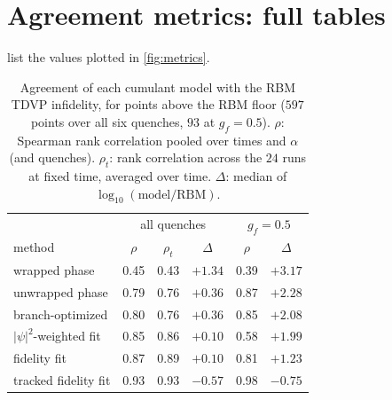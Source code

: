 \documentclass[11pt,a4paper]{article}
\begin{document}
\FloatBarrier
\section{Agreement metrics: full tables}\label{app:tables}
 list the values plotted in \cref{fig:metrics}.

\begin{table}[h]
  \centering
  \caption{Agreement of each cumulant model with the RBM TDVP infidelity, for points above the RBM floor ($597$ points over all six quenches, $93$ at $g_f=0.5$). $\rho$: Spearman rank correlation pooled over times and $\alpha$ (and quenches). $\rho_t$: rank correlation across the $24$ runs at fixed time, averaged over time. $\Delta$: median of $\log_{10}(\text{model}/\text{RBM})$.}
  \label{tab:methods}
  \begin{tabular}{lccccc}
    \toprule
    & \multicolumn{3}{c}{all quenches} & \multicolumn{2}{c}{$g_f=0.5$} \\
    method & $\rho$ & $\rho_t$ & $\Delta$ & $\rho$ & $\Delta$ \\
    \midrule
    wrapped phase & 0.45 & 0.43 & $+1.34$ & 0.39 & $+3.17$ \\
    unwrapped phase & 0.79 & 0.76 & $+0.36$ & 0.87 & $+2.28$ \\
    branch-optimized & 0.80 & 0.76 & $+0.36$ & 0.85 & $+2.08$ \\
    $|\psi|^2$-weighted fit & 0.85 & 0.86 & $+0.10$ & 0.58 & $+1.99$ \\
    fidelity fit & 0.87 & 0.89 & $+0.10$ & 0.81 & $+1.23$ \\
    tracked fidelity fit & 0.93 & 0.93 & $-0.57$ & 0.98 & $-0.75$ \\
    \bottomrule
  \end{tabular}
\end{table}
\end{document}

